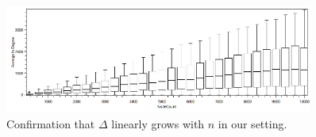 \begin{figure}[ht]
	\centering
		\includegraphics[width=0.90\textwidth]{figures/plots/boxplotndelta.png}
	\caption{Confirmation that $\Delta$ linearly grows with $n$ in our setting.}
	\label{fig:boxplotndelta}
\end{figure}




